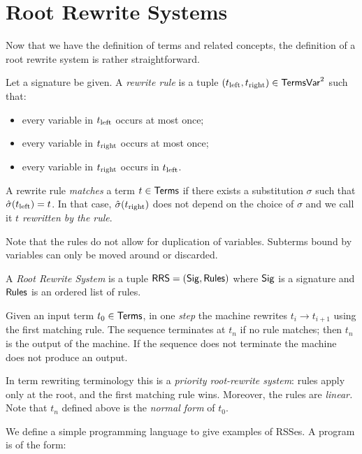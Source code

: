 \documentclass[11pt]{article}
\begin{document}
\section{Root Rewrite Systems}

Now that we have the definition of terms and related concepts, the definition
of a root rewrite system is rather straightforward.

\begin{definition}
Let a signature be given. A \emph{rewrite rule} is a tuple
$(t_{\mathrm{left}}, t_{\mathrm{right}}) \in \mathsf{TermsVar}^2$ such that:
\begin{itemize}
  \item every variable in $t_{\mathrm{left}}$ occurs at most once;
  \item every variable in $t_{\mathrm{right}}$ occurs at most once;
  \item every variable in $t_{\mathrm{right}}$ occurs in $t_{\mathrm{left}}$.
\end{itemize}
A rewrite rule \emph{matches} a term $t \in \mathsf{Terms}$ if there exists a substitution $\sigma$
such that $\hat{\sigma}(t_{\mathrm{left}}) = t$. In that case, $\hat{\sigma}(t_{\mathrm{right}})$ does not depend
on the choice of $\sigma$ and we call it \emph{$t$ rewritten by the rule}.
\end{definition}

Note that the rules do not allow for duplication of variables. Subterms bound by variables can
only be moved around or discarded.

\begin{definition}
A \emph{Root Rewrite System} is a tuple $\mathsf{RRS} = (\mathsf{Sig}, \mathsf{Rules})$
where $\mathsf{Sig}$ is a signature and $\mathsf{Rules}$ is an ordered list of rules.

Given an input term $t_0 \in \mathsf{Terms}$, in one \emph{step} the machine rewrites
$t_i \to t_{i+1}$ using the first matching rule. The sequence
terminates at $t_n$ if no rule matches; then $t_n$ is the output of the machine.
If the sequence does not terminate the machine does not produce an output.
\end{definition}

\begin{note}
In term rewriting terminology this is a \emph{priority root-rewrite system}: rules apply
only at the root, and the first matching rule wins. Moreover, the rules are \emph{linear.}
Note that $t_n$ defined above is the \emph{normal form} of $t_0$.
\end{note}

We define a simple programming language to give examples of RSSes. A program is of the form:
\end{document}
